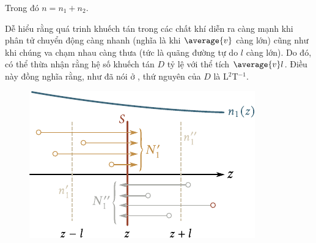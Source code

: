 \noindent
Trong đó $n=n_1+n_2$.

Dễ hiểu rằng quá trinh khuếch tán trong các chất khí diễn ra càng mạnh khi phân tử chuyển động càng nhanh (nghĩa là khi $\average{v}$ càng lớn) cũng như khi chúng va chạm nhau càng thưa (tức là quãng đường tự do $l$ càng lớn). Do đó, có thể thừa nhận rằng hệ số khuếch tán $D$ tỷ lệ với thể tích $\average{v}l$. Điều này đồng nghĩa rằng, như đã nói ở , thứ nguyên của $D$ là L$^2$T$^{-1}$.

\begin{figure}[!htb]
	\begin{center}
		\includegraphics[scale=1]{figures/ch_16/fig_16_6.pdf}
		\caption[]{}
		\label{fig:16_6}
	\end{center}
	\vspace{-0.8cm}
\end{figure}

